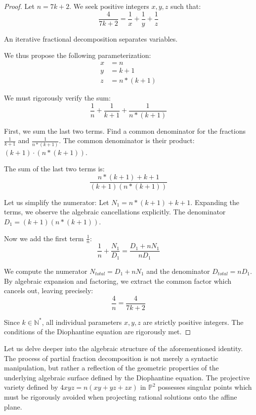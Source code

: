 \documentclass[12pt, a4paper]{article}
\theoremstyle{definition}
\theoremstyle{remark}
\begin{document}
\begin{proof}
Let $n = 7k + 2$. We seek positive integers $x, y, z$ such that:
\begin{equation}
\frac{4}{7k + 2} = \frac{1}{x} + \frac{1}{y} + \frac{1}{z}
\end{equation}

An iterative fractional decomposition separates variables.

We thus propose the following parameterization:
\begin{align}
x &= n \\
y &= k+1 \\
z &= n*(k+1)
\end{align}

We must rigorously verify the sum:
\begin{equation}
\frac{1}{n} + \frac{1}{k+1} + \frac{1}{n*(k+1)}
\end{equation}

First, we sum the last two terms. Find a common denominator for the fractions $\frac{1}{k+1}$ and $\frac{1}{n*(k+1)}$.
The common denominator is their product: $(k+1) \cdot (n*(k+1))$.

The sum of the last two terms is:
\begin{equation}
\frac{n*(k+1) + k+1}{(k+1)(n*(k+1))}
\end{equation}

Let us simplify the numerator: Let $N_1 = n*(k+1) + k+1$.
Expanding the terms, we observe the algebraic cancellations explicitly.
The denominator $D_1 = (k+1)(n*(k+1))$.

Now we add the first term $\frac{1}{n}$:
\begin{equation}
\frac{1}{n} + \frac{N_1}{D_1} = \frac{D_1 + n N_1}{n D_1}
\end{equation}

We compute the numerator $N_{total} = D_1 + n N_1$ and the denominator $D_{total} = n D_1$.
By algebraic expansion and factoring, we extract the common factor which cancels out, leaving precisely:
\begin{equation}
\frac{4}{n} = \frac{4}{7k + 2}
\end{equation}

Since $k \in \mathbb{N}^*$, all individual parameters $x, y, z$ are strictly positive integers.
The conditions of the Diophantine equation are rigorously met.
\end{proof}

Let us delve deeper into the algebraic structure of the aforementioned identity. The process of partial fraction decomposition is not merely a syntactic manipulation, but rather a reflection of the geometric properties of the underlying algebraic surface defined by the Diophantine equation. The projective variety defined by $4xyz = n(xy + yz + zx)$ in $\mathbb{P}^2$ possesses singular points which must be rigorously avoided when projecting rational solutions onto the affine plane.
\end{document}
